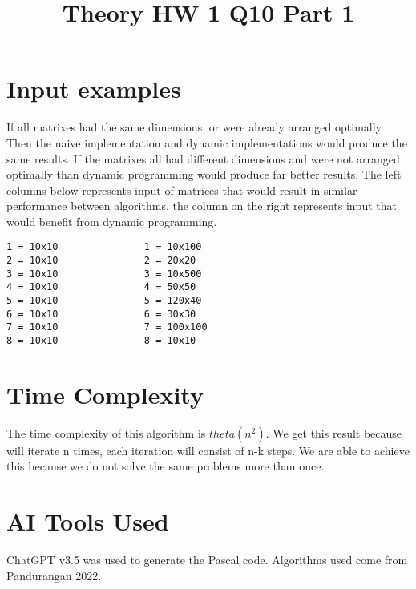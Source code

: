 \documentclass[conference]{IEEEtran}
\begin{document}
\section{Input examples}
If all matrixes had the same dimensions, or were already arranged optimally. Then the naive implementation and dynamic implementations would produce the same results. If the matrixes all had different dimensions and were not arranged optimally than dynamic programming would produce far better results. The left columns below represents input of matrices that would result in similar performance between algorithms, the column on the right represents input that would benefit from dynamic programming.
\begin{verbatim}
1 = 10x10               1 = 10x100
2 = 10x10               2 = 20x20
3 = 10x10               3 = 10x500
4 = 10x10               4 = 50x50
5 = 10x10               5 = 120x40
6 = 10x10               6 = 30x30
7 = 10x10               7 = 100x100
8 = 10x10               8 = 10x10
\end{verbatim}

\section{Time Complexity}
The time complexity of this algorithm is $theta(n^2)$. We get this result because will iterate n times, each iteration will consist of n-k steps. We are able to achieve this because we do not solve the same problems more than once.

\section{AI Tools Used}
ChatGPT v3.5 was used to generate the Pascal code. Algorithms used come from Pandurangan 2022.



\title{Theory HW 1 Q10 Part 1}

\author{
}

\maketitle
\end{document}
